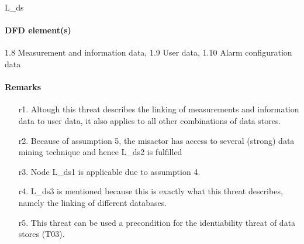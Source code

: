 L\_ds

\paragraph{DFD element(s)}

1.8 Measurement and information data, 1.9 User data, 1.10 Alarm configuration
data

\paragraph{Remarks}
	\begin{enumerate}
         \item[r1.] Altough this threat describes the linking of measurements
         and information data to user data, it also applies to all other
         combinations of data stores.
         \item[r2.] Because of assumption 5, the misactor has access to several
         (strong) data mining technique and hence L\_ds2 is fulfilled
         \item[r3.] Node L\_ds1 is applicable due to assumption 4.
         \item[r4.] L\_ds3 is mentioned because this is exactly what this threat
         describes, namely the linking of different databases.
         \item[r5.] This threat can be used a precondition for the identiability
         threat of data stores (T03).
    \end{enumerate}
